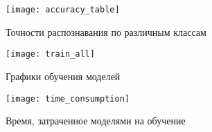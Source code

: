 \begin{figure}[H]
    \centering
    \texttt{[image: accuracy\_table]}
    \vspace*{-2cm}
    \caption{Точности распознавания по различным классам}
    \label{table-accuracy}
\end{figure}

\begin{figure}[H]
    \centering
    \texttt{[image: train\_all]}
    \vspace*{-1.3cm}
    \caption{Графики обучения моделей}
    \label{fig:train_all}
\end{figure}

\begin{figure}[H]
    \centering
    \texttt{[image: time\_consumption]}
    \vspace*{-0.5cm}
    \caption{Время, затраченное моделями на обучение}
    \label{time_consumption}
\end{figure}